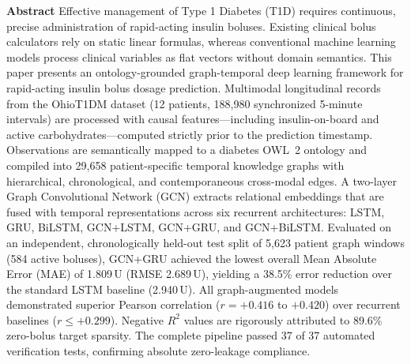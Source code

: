 \documentclass[10pt,a4paper]{article}
\begin{document}
\vspace{10pt}
\vspace{4pt}
\vspace{2pt}
\vspace{12pt}

\begingroup\small
\noindent\textbf{Abstract}\enspace
Effective management of Type 1 Diabetes (T1D) requires continuous, precise administration of rapid-acting insulin boluses. Existing clinical bolus calculators rely on static linear formulas, whereas conventional machine learning models process clinical variables as flat vectors without domain semantics. This paper presents an ontology-grounded graph-temporal deep learning framework for rapid-acting insulin bolus dosage prediction. Multimodal longitudinal records from the OhioT1DM dataset (12 patients, 188,980 synchronized 5-minute intervals) are processed with causal features—including insulin-on-board and active carbohydrates—computed strictly prior to the prediction timestamp. Observations are semantically mapped to a diabetes OWL~2 ontology and compiled into 29,658 patient-specific temporal knowledge graphs with hierarchical, chronological, and contemporaneous cross-modal edges. A two-layer Graph Convolutional Network (GCN) extracts relational embeddings that are fused with temporal representations across six recurrent architectures: LSTM, GRU, BiLSTM, GCN+LSTM, GCN+GRU, and GCN+BiLSTM. Evaluated on an independent, chronologically held-out test split of 5,623 patient graph windows (584 active boluses), GCN+GRU achieved the lowest overall Mean Absolute Error (MAE) of 1.809\,U (RMSE 2.689\,U), yielding a 38.5\% error reduction over the standard LSTM baseline (2.940\,U). All graph-augmented models demonstrated superior Pearson correlation ($r = +0.416$ to $+0.420$) over recurrent baselines ($r \le +0.299$). Negative $R^2$ values are rigorously attributed to 89.6\% zero-bolus target sparsity. The complete pipeline passed 37 of 37 automated verification tests, confirming absolute zero-leakage compliance.
\end{document}
